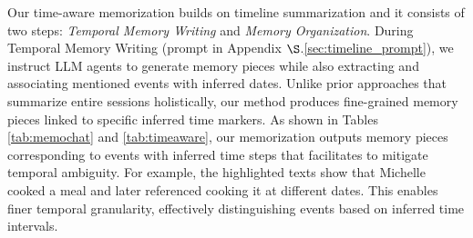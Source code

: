 Our time-aware memorization builds on timeline summarization \cite{steen-markert-2019-abstractive,rajaby-faghihi-etal-2022-crisiltlsum,sojitra2024timeline} and it consists of two steps: \textit{Temporal Memory Writing} and \textit{Memory Organization}. During Temporal Memory Writing (prompt in Appendix $\S$.\ref{sec:timeline_prompt}), we instruct LLM agents to generate memory pieces while also extracting and associating mentioned events with inferred dates. Unlike prior approaches that summarize entire sessions holistically, our method produces fine-grained memory pieces linked to specific inferred time markers. As shown in Tables \ref{tab:memochat} and \ref{tab:timeaware}, our memorization outputs memory pieces corresponding to events with inferred time steps that facilitates to mitigate temporal ambiguity. For example, the highlighted texts show that Michelle cooked a meal and later referenced cooking it at different dates. This enables finer temporal granularity, effectively distinguishing events based on inferred time intervals.

\begin{table}[h]
    \centering
    \caption{Output memory from MemoChat based on one dialogue session in LoCoMo.}
    \label{tab:memochat}
\end{table}

